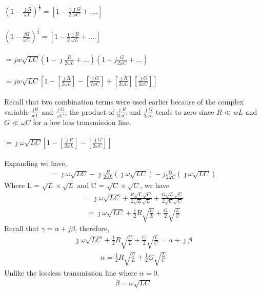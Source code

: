 $(1 - \frac{\jmath R}{\omega L})^{\frac{1}{2}} =[1 - \frac{1}{2}\frac{\jmath G}{\omega C} + ....]$\\\\
$(1 - \frac{jG}{\omega C})^{\frac{1}{2}} =[1 - \frac{1}{2}\frac{\jmath R}{\omega L} + ....]$\\\\
$= jw\sqrt{LC}(1 - \jmath \frac{R}{2\omega L} + ...)(1 - j\frac{G}{2\omega C} + ...)$\\\\
$= jw\sqrt{LC} [1- [\frac{\jmath R}{2\omega L}] - [\frac{\jmath G}{2\omega C}] + [\frac{\jmath R}{2\omega L}][\frac{\jmath G}{2\omega C}]]$\\\\
Recall that two combination terms were used earlier because of the complex variable $\frac{jR}{wL}$ and $\frac{\jmath G}{\omega C}$, the product of $\frac{\jmath R}{2\omega C}$ and $\frac{\jmath G}{2\omega L}$ tends to zero since $R \ll wL$ and $G \ll \omega C$ for a low loss transmission line.\\\\
$= \jmath\omega\sqrt{LC} [1- [\frac{\jmath R}{2\omega L}] - [\frac{\jmath G}{2\omega C}]]$\\\\
Expanding we have,
\begin{align*}
= \jmath\omega\sqrt{LC} - \jmath\frac{R}{2\omega L}(\jmath\omega\sqrt{LC}) - j\frac{G}{2\omega C}(\jmath\omega\sqrt{LC})
\end{align*}
Where L = $\sqrt{L} \times \sqrt{L}$ and C = $\sqrt{C} \times \sqrt{C}$, we have
\begin{align*}
= \jmath\omega\sqrt{LC} + \frac{R\sqrt{L}\sqrt{C}}{2\sqrt{L}\sqrt{L}} + \frac{G\sqrt{L}\sqrt{C}}{2\sqrt{C}\sqrt{C}}
\end{align*}
\begin{align*}
= \jmath\omega\sqrt{LC} + \frac{1}{2}R\sqrt{\frac{C}{L}} + \frac{G}{2}\sqrt{\frac{L}{C}} 
\end{align*}
Recall that $\gamma = \alpha + j\beta$, therefore,
\begin{align*}
\jmath\omega\sqrt{LC} + \frac{1}{2}R\sqrt{\frac{C}{L}} + \frac{G}{2}\sqrt{\frac{L}{C}} = \alpha + \jmath\beta
\end{align*}
\begin{align}
\alpha = \frac{1}{2}R\sqrt{\frac{C}{L}} + \frac{1}{2}G\sqrt{\frac{L}{C}}
\end{align}
Unlike the lossless transmission line where $\alpha = 0$.
\begin{align}
\beta = \omega\sqrt{LC}
\end{align}
